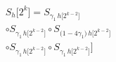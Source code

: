 \documentclass[preview]{standalone}
\begin{document}
\begin{center}
\begin{align*}S_{h}\!\big[2^{k}\big]= S_{\gamma_{1}\, h\!\big[2^{k-2}\big]} \\\circ S_{\gamma_{1}\, h\!\big[2^{k-2}\big]} \circ S_{\big(1 - 4\gamma_{1}\big)\, h\!\big[2^{k-2}\big]} \\\circ S_{\gamma_{1}\, h\!\big[2^{k-2}\big]} \circ S_{\gamma_{1}\, h\!\big[2^{k-2}\big]} \big]\end{align*}
\end{center}
\end{document}
